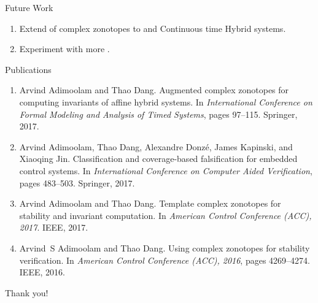 
\begin{frame}{Future Work}
\begin{enumerate}
\item Extend  of complex zonotopes to  and {Continuous time Hybrid systems}.
\item Experiment with more .
\end{enumerate}
\end{frame}

\begin{frame}{Publications}
\begin{enumerate}
\item Arvind Adimoolam and Thao Dang.
\newblock Augmented complex zonotopes for computing invariants of affine hybrid
  systems.
\newblock In {\em International Conference on Formal Modeling and Analysis of
  Timed Systems}, pages 97--115. Springer, 2017.

\item %
Arvind Adimoolam, Thao Dang, Alexandre Donz{\'e}, James Kapinski, and Xiaoqing
  Jin.
\newblock Classification and coverage-based falsification for embedded control
  systems.
\newblock In {\em International Conference on Computer Aided Verification},
  pages 483--503. Springer, 2017.


\item %
Arvind Adimoolam and Thao Dang.
\newblock Template complex zonotopes for stability and invariant computation.
\newblock In {\em American Control Conference (ACC), 2017}. IEEE, 2017.


\item %
Arvind~S Adimoolam and Thao Dang.
\newblock Using complex zonotopes for stability verification.
\newblock In {\em American Control Conference (ACC), 2016}, pages 4269--4274.
  IEEE, 2016.
\end{enumerate}
\end{frame}


\begin{frame}{}
\center
{\Huge {\color{blue} Thank you!}}
\end{frame}



